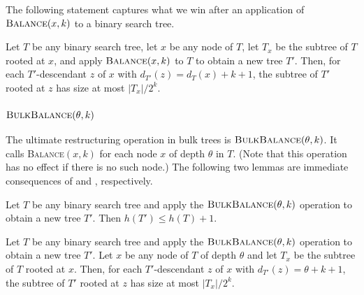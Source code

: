 \documentclass[10pt, conference, compsocconf]{IEEEtran}
\let\le\leqslant
\begin{document}
The following statement captures what we win after an application of $\textsc{Balance}(x,k)$ to a binary search tree.

\begin{lem}
  Let $T$ be any binary search tree, let $x$ be any node of $T$, let $T_x$ be the subtree of $T$ rooted at $x$, and apply $\textsc{Balance}(x,k)$ to $T$ to obtain a new tree $T'$.  Then, for each $T'$-descendant $z$ of $x$ with $d_{T'}(z) = d_{T}(x)+k+1$, the subtree of $T'$ rooted at $z$ has size at most $|T_x|/2^k$.  \end{lem}


\subsubsection{$\textsc{BulkBalance}(\theta,k)$}

The ultimate restructuring operation in bulk trees is $\textsc{BulkBalance}(\theta,k)$.
It calls \textsc{Balance}$(x,k)$ for each node $x$ of depth $\theta$ in $T$.
(Note that this operation has no effect if there is no such node.)
The following two lemmas are immediate consequences of  and , respectively.

\begin{lem}
  Let $T$ be any binary search tree and apply the $\textsc{BulkBalance}(\theta,k)$ operation to obtain a new tree $T'$.  Then $h(T')\le h(T)+1$.
\end{lem}

\begin{lem}
  Let $T$ be any binary search tree and apply the $\textsc{BulkBalance}(\theta,k)$ operation to obtain a new tree $T'$.
  Let $x$ be any node of $T$ of depth $\theta$ and let $T_x$ be the subtree of $T$ rooted at $x$.
  Then, for each $T'$-descendant $z$ of $x$ with $d_{T'}(z) = \theta+k+1$, the subtree of $T'$ rooted at $z$ has size at most $|T_x|/2^k$.
\end{lem}
\end{document}
